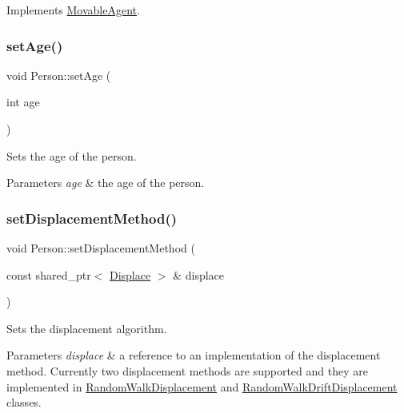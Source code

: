 Implements \hyperlink{class_movable_agent_a88b617f0e78c817634e5b587da045ab0}{Movable\+Agent}.

\mbox{\label{class_person_ac8ade54c27a0657c987c395ff04a9d46}} 
\subsubsection{\texorpdfstring{set\+Age()}{setAge()}}
{\footnotesize\ttfamily void Person\+::set\+Age (\begin{DoxyParamCaption}\item[{int}]{age }\end{DoxyParamCaption})}

Sets the age of the person. 
\begin{DoxyParams}{Parameters}
{\em age} & the age of the person. \\
\hline
\end{DoxyParams}
\mbox{\label{class_person_a89ada26d3541bc82e514dae833dc959d}} 
\subsubsection{\texorpdfstring{set\+Displacement\+Method()}{setDisplacementMethod()}}
{\footnotesize\ttfamily void Person\+::set\+Displacement\+Method (\begin{DoxyParamCaption}\item[{const shared\+\_\+ptr$<$ \hyperlink{class_displace}{Displace} $>$ \&}]{displace }\end{DoxyParamCaption})}

Sets the displacement algorithm. 
\begin{DoxyParams}{Parameters}
{\em displace} & a reference to an implementation of the displacement method. Currently two displacement methods are supported and they are implemented in \hyperlink{class_random_walk_displacement}{Random\+Walk\+Displacement} and \hyperlink{class_random_walk_drift_displacement}{Random\+Walk\+Drift\+Displacement} classes. \\
\hline
\end{DoxyParams}
\mbox{\label{class_person_a05f4ac2107d59e03f0f336eda08aa358}} 
